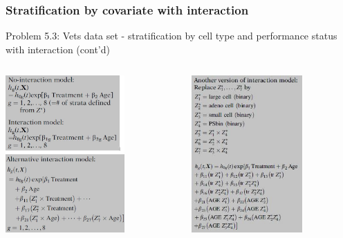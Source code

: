 \documentclass{beamer}
\theoremstyle{definition}
\begin{document}
\begin{frame}
\frametitle{Stratification by covariate with interaction}
\begin{block}{Problem 5.3: Vets data set - stratification by cell type and performance status with interaction (cont'd)}
\begin{columns}
    \begin{column}{0.48\textwidth}
        \includegraphics[width =\textwidth, height=6cm]{C5_models1.JPG}
    \end{column}
    \hspace{-10pt}
    \begin{column}{0.48\textwidth}
         \includegraphics[width =\textwidth, height=6cm]{C5_models3.JPG}
    \end{column}
\end{columns}
\end{block}
\end{frame}
\end{document}
